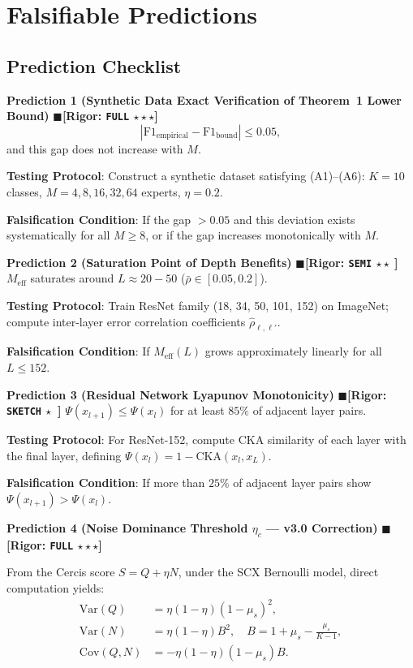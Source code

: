 \documentclass[12pt,a4paper]{article}
\theoremstyle{definition}
\theoremstyle{remark}
\newcommand{\rigorFull}{$\blacksquare$\;\textbf{[Rigor: \texttt{FULL} $\star\star\star$]}}
\newcommand{\rigorSemi}{$\blacksquare$\;\textbf{[Rigor: \texttt{SEMI} $\star\star\;$]}}
\newcommand{\rigorSketch}{$\blacksquare$\;\textbf{[Rigor: \texttt{SKETCH} $\star\;\;$]}}
\begin{document}
\section{Falsifiable Predictions}

\subsection{Prediction Checklist}

\textbf{Prediction 1 (Synthetic Data Exact Verification of Theorem~1 Lower Bound)}
\rigorFull
\begin{equation}
|\mathrm{F1}_{\text{empirical}} - \mathrm{F1}_{\text{bound}}| \leq 0.05,
\end{equation}
and this gap does not increase with $M$.

\textbf{Testing Protocol}: Construct a synthetic dataset satisfying (A1)--(A6): $K=10$ classes, $M=4,8,16,32,64$ experts, $\eta=0.2$.

\textbf{Falsification Condition}: If the gap $>0.05$ and this deviation exists systematically for all $M \geq 8$, or if the gap increases monotonically with $M$.

\medskip
\textbf{Prediction 2 (Saturation Point of Depth Benefits)}
\rigorSemi
$M_{\text{eff}}$ saturates around $L \approx 20-50$ ($\bar{\rho} \in [0.05, 0.2]$).

\textbf{Testing Protocol}: Train ResNet family (18, 34, 50, 101, 152) on ImageNet; compute inter-layer error correlation coefficients $\hat{\rho}_{\ell,\ell'}$.

\textbf{Falsification Condition}: If $M_{\text{eff}}(L)$ grows approximately linearly for all $L \leq 152$.

\medskip
\textbf{Prediction 3 (Residual Network Lyapunov Monotonicity)}
\rigorSketch
$\Psi(x_{l+1}) \leq \Psi(x_l)$ for at least $85\%$ of adjacent layer pairs.

\textbf{Testing Protocol}: For ResNet-152, compute CKA similarity of each layer with the final layer, defining $\Psi(x_l) = 1 - \mathrm{CKA}(x_l, x_L)$.

\textbf{Falsification Condition}: If more than $25\%$ of adjacent layer pairs show $\Psi(x_{l+1}) > \Psi(x_l)$.

\medskip
\textbf{Prediction 4 (Noise Dominance Threshold $\eta_c$ --- v3.0 Correction)}
\rigorFull

From the Cercis score $S = Q + \eta N$, under the SCX Bernoulli model, direct computation yields:
\begin{align}
\mathrm{Var}(Q) &= \eta(1-\eta)(1-\mu_s)^2, \\
\mathrm{Var}(N) &= \eta(1-\eta)B^2, \quad B = 1 + \mu_s - \frac{\mu_s}{K-1}, \\
\mathrm{Cov}(Q,N) &= -\eta(1-\eta)(1-\mu_s)B.
\end{align}
\end{document}
